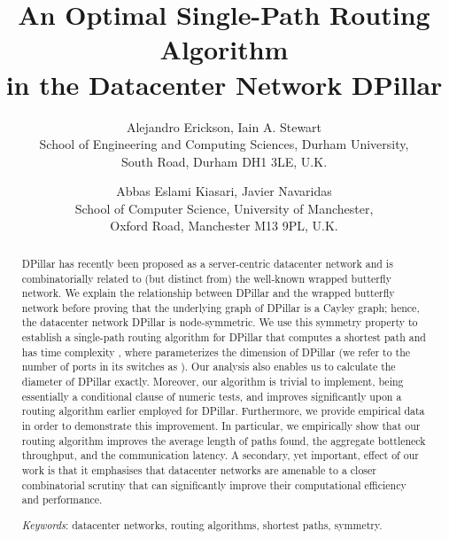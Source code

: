 \documentclass{article}
\begin{document}
\title{An Optimal Single-Path Routing Algorithm\\ in the Datacenter Network DPillar}

\author{Alejandro Erickson, Iain A. Stewart\\School of Engineering and Computing
  Sciences, Durham University,\\South Road, Durham DH1 3LE, U.K. \and Abbas Eslami Kiasari, Javier Navaridas\\School of Computer Science, University of Manchester,\\Oxford Road, Manchester M13 9PL, U.K.}

\date{}

\maketitle

\begin{abstract}
DPillar has recently been proposed as a server-centric datacenter network and is combinatorially related to (but distinct from) the well-known wrapped butterfly network. We explain the relationship between DPillar and the wrapped butterfly network before proving that the underlying graph of DPillar is a Cayley graph; hence, the datacenter network DPillar is node-symmetric. We use this symmetry property to establish a single-path routing algorithm for DPillar that computes a shortest path and has time complexity , where  parameterizes the dimension of DPillar (we refer to the number of ports in its switches as ). Our analysis also enables us to calculate the diameter of DPillar exactly. Moreover, our algorithm is trivial to implement, being essentially a conditional clause of numeric tests, and improves significantly upon a routing algorithm earlier employed for DPillar. Furthermore, we provide empirical data in order to demonstrate this improvement. In particular, we empirically show that our routing algorithm improves the average length of paths found, the aggregate bottleneck throughput, and the communication latency. A secondary, yet important, effect of our work is that it emphasises that datacenter networks are amenable to a closer combinatorial scrutiny that can significantly improve their computational efficiency and performance.

\noindent\emph{Keywords\/}: datacenter networks, routing algorithms, shortest paths, symmetry.
\end{abstract}
\end{document}
